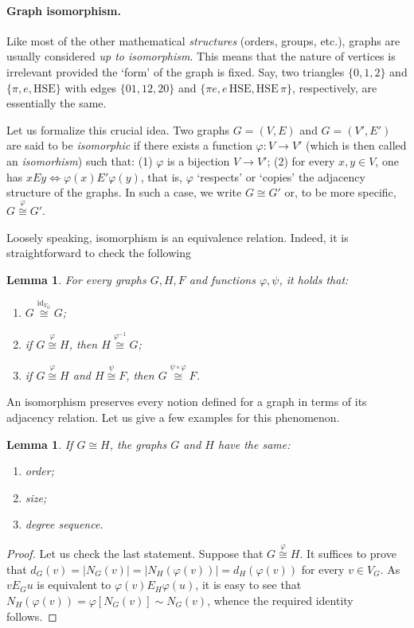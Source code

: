 \documentclass[12pt,notitlepage]{article}
\theoremstyle{plain}
\newtheorem{lemma}[thm]{Lemma}
\theoremstyle{definition}
\theoremstyle{plain}
\renewcommand{\phi}{\varphi}
\newcommand{\id}{\mathrm{id}}
\newcommand{\1}{\mathbf{1}}
\newcommand{\0}{\mathbf{0}}
\begin{document}
\paragraph{Graph isomorphism.} Like most of the other mathematical \emph{structures} (orders, groups, etc.), graphs are usually considered \emph{up to isomorphism}. This means that the nature of vertices is irrelevant provided the `form' of the graph is fixed. Say, two triangles $\{0, 1, 2\}$ and $\{\pi, e, \mathrm{HSE}\}$ with edges $\{01, 12, 20 \}$ and $\{ \pi e, e\, \mathrm{HSE}, \mathrm{HSE}\, \pi \}$, respectively, are essentially the same.

Let us formalize this crucial idea. Two graphs $G = (V, E)$ and $G = (V', E')$ are said to be \emph{isomorphic} if there exists a function $\phi \colon V \to V'$ (which is then called an \emph{isomorhism}) such that: (1) $\phi$ is a bijection $V \to V'$; (2) for every $x, y \in V$, one has $x E y \iff \phi(x) E' \phi(y)$, that is, $\phi$ `respects' or `copies' the adjacency structure of the graphs. In such a case, we write $G \cong G'$ or, to be more specific, $G \stackrel{\phi}{\cong} G'$.

Loosely speaking, isomorphism is an equivalence relation. Indeed, it is straightforward to check the following
\begin{lemma} For every graphs $G, H, F$ and functions $\phi, \psi$, it holds that:
\begin{enumerate}
\item $G \stackrel{\id_{V_G}}{\cong} G$;
\item if $G \stackrel{\phi}{\cong} H$, then $H \stackrel{\phi^{-1}}{\cong} G$;
\item if $G \stackrel{\phi}{\cong} H$ and $H \stackrel{\psi}{\cong} F$, then $G \stackrel{\psi \circ \phi}{\cong} F$.
\end{enumerate}
\end{lemma}

An isomorphism preserves every notion defined for a graph in terms of its adjacency relation. Let us give a few examples for this phenomenon.
\begin{lemma} If $G \cong H$, the graphs $G$ and $H$ have the same:
\begin{enumerate}
\item order;
\item size;
\item degree sequence.
\end{enumerate}
\end{lemma}
\begin{proof}
Let us check the last statement. Suppose that $G \stackrel{\phi}{\cong} H$. It suffices to prove that $d_G(v) = |N_G(v)| = |N_H(\phi(v))| = d_H(\phi(v))$ for every $v \in V_G$. As $v E_G u$ is equivalent to $\phi(v) E_H \phi(u)$, it is easy to see that $N_H(\phi(v)) = \phi[N_G(v)] \sim N_G(v)$, whence the required identity follows.
\end{proof}
\end{document}
